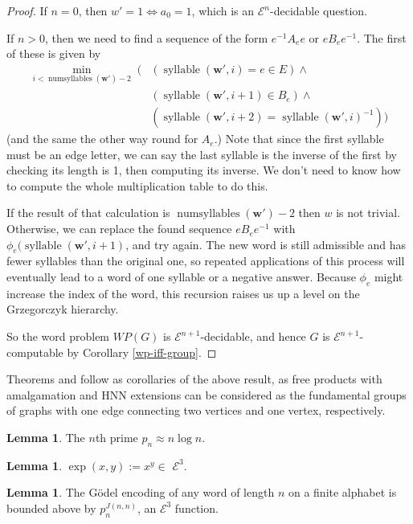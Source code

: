 \documentclass[a4paper]{article}
\newcommand{\grz}[1]{$\mathcal{E}^{#1}$}	%
\newcommand{\wvec}{\mathbf{w}}	%
\theoremstyle{plain}
\theoremstyle{definition}
\newtheorem{lemma}[theorem]{Lemma}
\begin{document}
\begin{proof}
If $n=0$, then $w'=1 \Leftrightarrow a_0=1$, which is an \grz{n}-decidable question.

If $n>0$, then we need to find a sequence of the form $e^{-1}A_ee$ or $eB_ee^{-1}$. The first of these is given by
\begin{equation}
\begin{split}
	\min_{i < \operatorname{numsyllables}(\wvec')-2} \; (&  (\operatorname{syllable}(\wvec',i) = e \in E) \wedge \\ 
	& ( \operatorname{syllable}(\wvec',i+1) \in B_e ) \wedge \\ 
	& ( \operatorname{syllable}(\wvec',i+2) = \operatorname{syllable}(\wvec',i)^{-1} ) )
\end{split} 
\end{equation}
(and the same the other way round for $A_e$.) Note that since the first syllable must be an edge letter, we can say the last syllable is the inverse of the first by checking its length is 1, then computing its inverse. We don't need to know how to compute the whole multiplication table to do this.

If the result of that calculation is $\operatorname{numsyllables}(\wvec')-2$ then $w$ is not trivial. Otherwise, we can replace the found sequence $eB_ee^{-1}$ with $\phi_e(\operatorname{syllable}(\wvec',i+1)$, and try again. The new word is still admissible and has fewer syllables than the original one, so repeated applications of this process will eventually lead to a word of one syllable or a negative answer. Because $\phi_e$ might increase the index of the word, this recursion raises us up a level on the Grzegorczyk hierarchy.

So the word problem $WP(G)$ is \grz{n+1}-decidable, and hence $G$ is \grz{n+1}-computable by Corollary \ref{wp-iff-group}.
\end{proof}

Theorems \cite[4.6]{Cannonito_1973} and \cite[5.3]{Cannonito_1973} follow as corollaries of the above result, as free products with amalgamation and HNN extensions can be considered as the fundamental groups of graphs with one edge connecting two vertices and one vertex, respectively.

\begin{lemma}\label{primedist}
The $n$th prime $p_n \approx n \log n$.
\end{lemma}
\begin{lemma}\label{expine3}
$\exp(x,y) := x^y \in $ \grz{3}.
\end{lemma}
\begin{lemma}\label{godelbound}
The G\"odel encoding of any word of length $n$ on a finite alphabet is bounded above by $p_n^{J(n,n)}$, an \grz{3} function.
\end{lemma}
\end{document}
